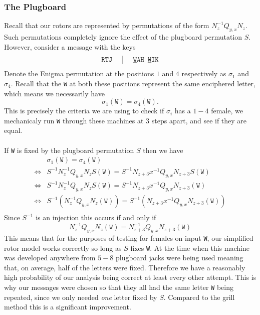 \subsubsection{The Plugboard}
Recall that our rotors are represented by permutations of the form
$N_{z}^{-1}Q_{y,x}N_{z}$. Such permutations completely ignore the
effect of the plugboard permutation $S$. However, consider a message
with the keys
\[
	\setlength{\arraycolsep}{15pt}
	\begin{array}{c | c}
		\texttt{RTJ} & {\uline{\texttt{W}}}\texttt{AH
		}{\uline{\texttt{W}}}\texttt{IK}              \\
	\end{array}
\]
Denote the Enigma permutation at the positions $1$ and $4$
respectively as $\sigma_1$ and $\sigma_4$. Recall that the \texttt{W}
at both these positions represent the same enciphered letter, which
means we necessarily have
\[
	\sigma_1(\texttt{W}) = \sigma_4(\texttt{W}).
\]
This is precisely the criteria we are using to check if $\sigma_i$
has a $1-4$ female, we mechanicaly run \texttt{W} through these
machines at 3 steps apart, and see if they are equal.
\\\\If \texttt{W} is fixed by the plugboard permutation $S$ then we have
\begin{align*}
	     & \sigma_1(\texttt{W}) = \sigma_4(\texttt{W})
	\\
	\iff & S^{-1}N_z^{-1}Q_{y,x}N_zS(\texttt{W}) =
	S^{-1}N_{z+3}x^{-1}Q_{y,x}N_{z+3}S(\texttt{W})     \\
	\iff & S^{-1}N_z^{-1}Q_{y,x}N_zS(\texttt{W}) =
	S^{-1}N_{z+3}x^{-1}Q_{y,x}N_{z+3}(\texttt{W})      \\
	\iff & S^{-1}(N_z^{-1}Q_{y,x}N_z(\texttt{W})) =
	S^{-1}(N_{z+3}x^{-1}Q_{y,x}N_{z+3}(\texttt{W}))    \\
\end{align*}
Since $S^{-1}$ is an injection this occurs if and only if
\[
	N_z^{-1}Q_{y,x}N_z(\texttt{W}) = N_{z+3}^{-1}Q_{y,x}N_{z+3}(\texttt{W})
\]
This means that for the purposes of testing for females on input
\texttt{W}, our simplified rotor model works correctly so long as $S$
fixes \texttt{W}. At the time when this machine was developed
anywhere from $5-8$ plugboard jacks were being used meaning that, on
average, half of the letters were fixed. Therefore we have a
reasonably high probability of our analysis being correct at least
every other attempt. This is why our messages were chosen so that
they all had the same letter \texttt{W} being repeated, since we only
needed \emph{one} letter fixed by $S$. Compared to the grill method
this is a significant improvement.

